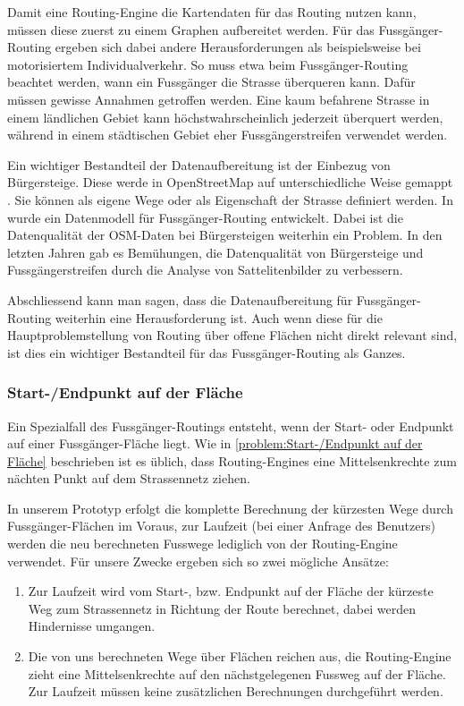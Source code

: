 Damit eine Routing-Engine die Kartendaten für das Routing nutzen kann, müssen diese zuerst zu einem Graphen aufbereitet werden. Für das Fussgänger-Routing ergeben sich dabei andere Herausforderungen als beispielsweise bei motorisiertem Individualverkehr. So muss etwa beim Fussgänger-Routing beachtet werden, wann ein Fussgänger die Strasse überqueren kann. Dafür müssen gewisse Annahmen getroffen werden. Eine kaum befahrene Strasse in einem ländlichen Gebiet kann höchstwahrscheinlich jederzeit überquert werden, während in einem städtischen Gebiet eher Fussgängerstreifen verwendet werden.

Ein wichtiger Bestandteil der Datenaufbereitung ist der Einbezug von Bürgersteige. Diese werde in OpenStreetMap auf unterschiedliche Weise gemappt \cite{osm_wiki_sidewalks}. Sie können als eigene Wege oder als Eigenschaft der Strasse definiert werden. In \cite{pedestrian_navigation_lang} wurde ein Datenmodell für Fussgänger-Routing entwickelt. Dabei ist die Datenqualität der \ac{OSM}-Daten bei Bürgersteigen weiterhin ein Problem. In den letzten Jahren gab es Bemühungen, die Datenqualität von Bürgersteige \cite{mapbox_sidewalk_improving} und Fussgängerstreifen \cite{crosswalks_aerial_extraction} durch die Analyse von Sattelitenbilder zu verbessern.

Abschliessend kann man sagen, dass die Datenaufbereitung für Fussgänger-Routing weiterhin eine Herausforderung ist. Auch wenn diese für die Hauptproblemstellung von Routing über offene Flächen nicht direkt relevant sind, ist dies ein wichtiger Bestandteil für das Fussgänger-Routing als Ganzes.


\subsubsection{Start-/Endpunkt auf der Fläche}
\label{subsub:Start-/Endpunkt auf der Fläche}
Ein Spezialfall des Fussgänger-Routings entsteht, wenn der Start- oder Endpunkt auf einer Fussgänger-Fläche liegt. Wie in \ref{problem:Start-/Endpunkt auf der Fläche} beschrieben ist es üblich, dass Routing-Engines eine Mittelsenkrechte zum nächten Punkt auf dem Strassennetz ziehen.

In unserem Prototyp erfolgt die komplette Berechnung der kürzesten Wege durch Fussgänger-Flächen im Voraus, zur Laufzeit (bei einer Anfrage des Benutzers) werden die neu berechneten Fusswege lediglich von der Routing-Engine verwendet. Für unsere Zwecke ergeben sich so zwei mögliche Ansätze:

\begin{enumerate}
    \item Zur Laufzeit wird vom Start-, bzw. Endpunkt auf der Fläche der kürzeste Weg zum Strassennetz in Richtung der Route berechnet, dabei werden Hindernisse umgangen.
    \item Die von uns berechneten Wege über Flächen reichen aus, die Routing-Engine zieht eine Mittelsenkrechte auf den nächstgelegenen Fussweg auf der Fläche. Zur Laufzeit müssen keine zusätzlichen Berechnungen durchgeführt werden.
\end{enumerate}

